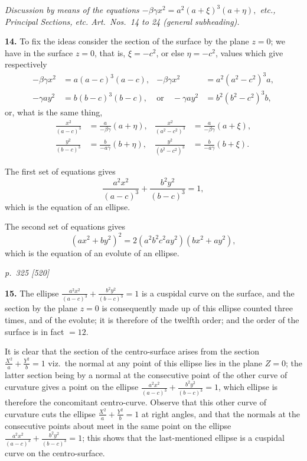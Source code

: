 \documentclass[11pt,a4paper]{book}
\begin{document}
\textit{Discussion by means of the equations $-\beta\gamma x^2 = a^2(a + \xi)^3(a + \eta),$ etc., Principal Sections, etc. Art.\ Nos.\ 14 to 24 (general subheading).}

\textbf{14.} To fix the ideas consider the section of the surface by the plane $z = 0$; we have in the surface $z = 0$, that is, $\xi = -c^2$, or else $\eta = -c^2$, values which give respectively
\begin{align*}
-\beta\gamma x^2 &= a(a - c)^3(a - c), & -\beta\gamma x^2 &= a^2(a^2 - c^2)^3 a,\\
-\gamma a y^2 &= b(b - c)^3(b - c), & \text{or}\quad -\gamma a y^2 &= b^2(b^2 - c^2)^3 b,
\end{align*}
or, what is the same thing,
\begin{align*}
\tfrac{x^2}{(a - c)^3} &= \tfrac{a}{-\beta\gamma}(a + \eta), & \tfrac{x^2}{(a^2 - c^2)^3} &= \tfrac{a}{-\beta\gamma}(a + \xi),\\
\tfrac{y^2}{(b - c)^3} &= \tfrac{b}{-a\gamma}(b + \eta), & \tfrac{y^2}{(b^2 - c^2)^3} &= \tfrac{b}{-a\gamma}(b + \xi).
\end{align*}

The first set of equations gives
\[
\frac{a^2 x^2}{(a - c)^3} + \frac{b^2 y^2}{(b - c)^3} = 1,
\]
which is the equation of an ellipse.

The second set of equations gives
\[
(a x^2 + b y^2)^2 = 2(a^2 b^2 c^2 a y^2)(b x^2 + a y^2),
\]
which is the equation of an evolute of an ellipse.

\clearpage

\bigskip
\textit{p.~325 [520]}
\smallskip

\textbf{15.} The ellipse $\tfrac{a^2 x^2}{(a - c)^3} + \tfrac{b^2 y^2}{(b - c)^3} = 1$ is a cuspidal curve on the surface, and the section by the plane $z = 0$ is consequently made up of this ellipse counted three times, and of the evolute; it is therefore of the twelfth order; and the order of the surface is in fact $= 12$.

It is clear that the section of the centro-surface arises from the section $\tfrac{X^2}{a} + \tfrac{Y^2}{b} = 1$ viz.\ the normal at any point of this ellipse lies in the plane $Z = 0$; the latter section being by a normal at the consecutive point of the other curve of curvature gives a point on the ellipse $\tfrac{a^2 x^2}{(a - c)^3} + \tfrac{b^2 y^2}{(b - c)^3} = 1$, which ellipse is therefore the concomitant centro-curve. Observe that this other curve of curvature cuts the ellipse $\tfrac{X^2}{a} + \tfrac{Y^2}{b} = 1$ at right angles, and that the normals at the consecutive points about meet in the same point on the ellipse $\tfrac{a^2 x^2}{(a - c)^3} + \tfrac{b^2 y^2}{(b - c)^3} = 1$; this shows that the last-mentioned ellipse is a cuspidal curve on the centro-surface.
\end{document}
